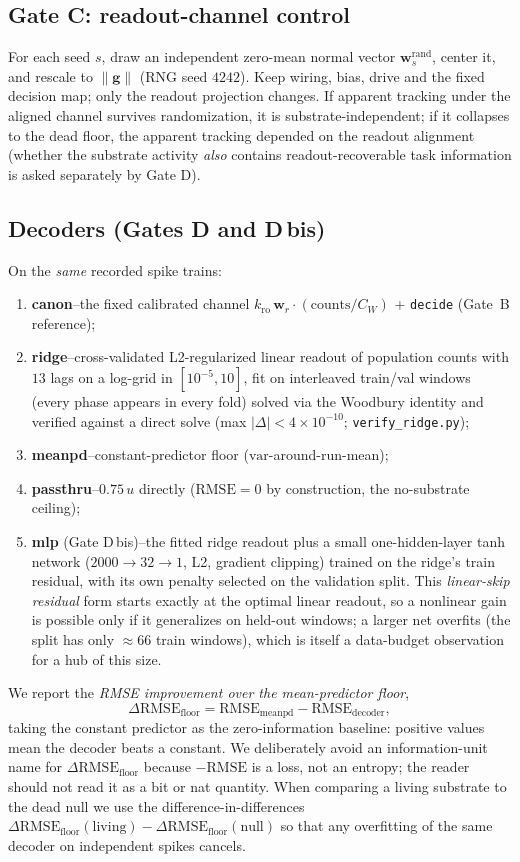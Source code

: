 \documentclass[10pt,a4paper]{article}
\newcommand{\RMSE}{\ensuremath{\mathrm{RMSE}}}
\newcommand{\dfloor}{\ensuremath{\Delta\RMSE_{\mathrm{floor}}}}
\newcommand{\palt}{0.75\,u}          %
\begin{document}
\subsection{Gate C: readout-channel control}\label{sec:gatec}

For each seed $s$, draw an independent zero-mean normal vector
$\mathbf{w}^{\mathrm{rand}}_s$, center it, and rescale to
$\|\mathbf{g}\|$ (RNG seed $4242$). Keep wiring, bias, drive and the
fixed decision map; only the readout projection changes. If apparent
tracking under the aligned channel survives randomization, it is
substrate-independent; if it collapses to the dead floor, the apparent
tracking depended on the readout alignment (whether the substrate
activity \emph{also} contains readout-recoverable task information is
asked separately by Gate D).

\subsection{Decoders (Gates D and D\,bis)}\label{sec:decoders}

On the \emph{same} recorded spike trains:
\begin{enumerate}[nosep]
\item \textbf{canon}--the fixed calibrated channel
$k_{\mathrm{ro}}\,\mathbf{w}_r\!\cdot(\mathrm{counts}/C_W)$ +
\texttt{decide} (Gate~B reference);
\item \textbf{ridge}--cross-validated L2-regularized linear readout of
population counts with $13$ lags on a log-grid in
$[10^{-5},10]$, fit on interleaved train/val windows (every phase appears
in every fold) solved via the Woodbury identity and verified against a
direct solve (max $|\Delta|<4\times10^{-10}$; \texttt{verify\_ridge.py});
\item \textbf{meanpd}--constant-predictor floor
($\mathrm{var}$-around-run-mean);
\item \textbf{passthru}--$\palt$ directly ($\RMSE=0$ by construction,
the no-substrate ceiling);
\item \textbf{mlp} (Gate D\,bis)--the fitted ridge readout plus a small
one-hidden-layer tanh network ($2000\!\to\!32\!\to\!1$, L2, gradient
clipping) trained on the ridge's train residual, with its own penalty
selected on the validation split. This \emph{linear-skip residual} form
starts exactly at the optimal linear readout, so a nonlinear gain is
possible only if it generalizes on held-out windows; a larger net
overfits (the split has only $\approx66$ train windows), which is itself
a data-budget observation for a hub of this size.
\end{enumerate}
We report the \emph{RMSE improvement over the mean-predictor floor},
\[
\dfloor = \RMSE_{\mathrm{meanpd}}-\RMSE_{\mathrm{decoder}},
\]
taking the constant predictor as the zero-information baseline:
positive values mean the decoder beats a constant. We deliberately avoid
an information-unit name for $\dfloor$ because $-\RMSE$ is a loss, not
an entropy; the reader should not read it as a bit or nat quantity.
When comparing a living substrate to the dead null we use the
difference-in-differences $\dfloor(\text{living})-\dfloor(\text{null})$
so that any overfitting of the same decoder on independent spikes
cancels.
\end{document}
